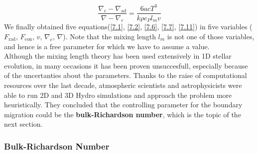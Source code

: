 \documentclass[11pt]{article}
\numberwithin{equation}{section}
\begin{document}
\begin{equation}\label{7.11}
\frac{\nabla_e - \nabla_{\mathrm{ad}}}{\nabla - \nabla_e} = \frac{6acT^3}{k \rho c_P l_m v}
\end{equation}
We finally obtained five equations(\ref{7.1}, \ref{7.2}, \ref{7.6}, \ref{7.7}, \ref{7.11}) in five variables ($F_{\mathrm{rad}}$, $F_{\mathrm{con}}$, $v$, $\nabla_e$, $\nabla$). Note that the mixing length $l_m$ is not one of those variables, and hence is a free parameter for which we have to assume a value. \\
Although the mixing length theory has been used extensively in 1D stellar evolution, in many occasions it has been proven unsuccesfull, especially because of the uncertanties about the parameters. Thanks to the raise of computational resources over the last decade, atmospheric scientists and astrophysicists were able to run 2D and 3D Hydro simulations and approach the problem more heuristically. They concluded that the controlling parameter for the boundary migration could be the \textbf{bulk-Richardson number}, which is the topic of the next section.  


\subsubsection{Bulk-Richardson Number}
\end{document}
